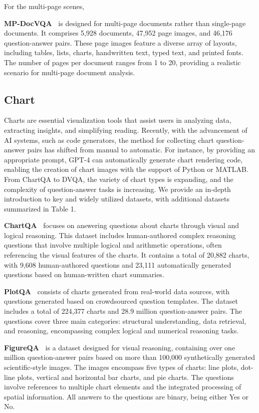 \noindent For the multi-page scenes,

\textbf{MP-DocVQA~\cite{tito2023hierarchical}} is designed for multi-page documents rather than single-page documents. It comprises 5,928 documents, 47,952 page images, and 46,176 question-answer pairs. These page images feature a diverse array of layouts, including tables, lists, charts, handwritten text, typed text, and printed fonts. The number of pages per document ranges from 1 to 20, providing a realistic scenario for multi-page document analysis.

\subsection{Chart}
Charts are essential visualization tools that assist users in analyzing data, extracting insights, and simplifying reading. Recently, with the advancement of AI systems, such as code generators, the method for collecting chart question-answer pairs has shifted from manual to automatic. For instance, by providing an appropriate prompt, GPT-4 can automatically generate chart rendering code, enabling the creation of chart images with the support of Python or MATLAB. From ChartQA to DVQA, the variety of chart types is expanding, and the complexity of question-answer tasks is increasing. We provide an in-depth introduction to key and widely utilized datasets, with additional datasets summarized in Table 1.

\noindent \textbf{ChartQA~\cite{masry2022chartqa}} focuses on answering questions about charts through visual and logical reasoning. This dataset includes human-authored complex reasoning questions that involve multiple logical and arithmetic operations, often referencing the visual features of the charts. It contains a total of 20,882 charts, with 9,608 human-authored questions and 23,111 automatically generated questions based on human-written chart summaries.

\noindent \textbf{PlotQA~\cite{methani2020plotqa}} consists of charts generated from real-world data sources, with questions generated based on crowdsourced question templates. The dataset includes a total of 224,377 charts and 28.9 million question-answer pairs. The questions cover three main categories: structural understanding, data retrieval, and reasoning, encompassing complex logical and numerical reasoning tasks.

\noindent \textbf{FigureQA~\cite{kahou2017figureqa}} is a dataset designed for visual reasoning, containing over one million question-answer pairs based on more than 100,000 synthetically generated scientific-style images. The images encompass five types of charts: line plots, dot-line plots, vertical and horizontal bar charts, and pie charts. The questions involve references to multiple chart elements and the integrated processing of spatial information. All answers to the questions are binary, being either Yes or No.


